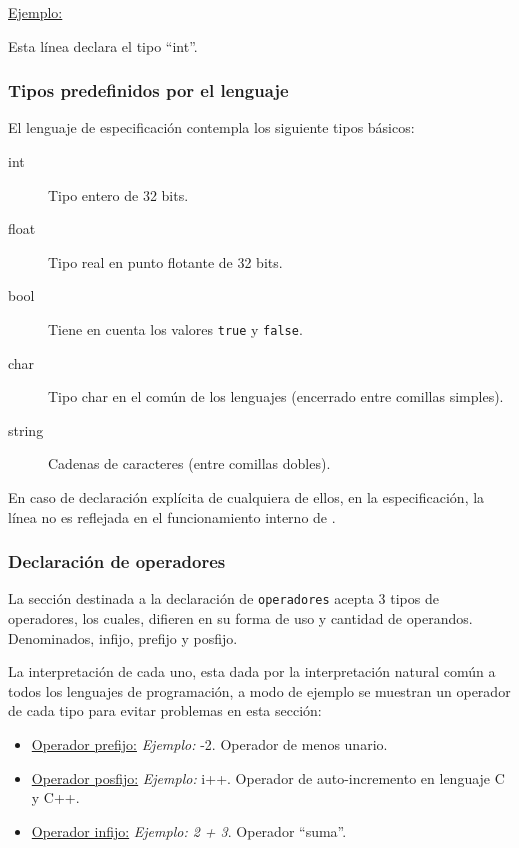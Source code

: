 \underline{Ejemplo:} \begin{center}
    \end{center}
\vspace{0.2cm}
Esta línea declara el tipo ``int''.

\subsubsection*{Tipos predefinidos por el lenguaje}
\label{sec:typepredefined}

El lenguaje de especificación contempla los siguiente tipos básicos:

\begin{description}
\item [int] Tipo entero de 32 bits.

\item [float] Tipo real en punto flotante de 32 bits.

\item [bool] Tiene en cuenta los valores \texttt{true} y \texttt{false}.

\item [char] Tipo char en el común de los lenguajes (encerrado entre comillas simples).

\item [string] Cadenas de caracteres (entre comillas dobles).
\end{description}

En caso de declaración explícita de cualquiera de ellos, en la especificación, la línea no es reflejada en el funcionamiento interno de \maggen.

\subsubsection{Declaración de operadores}
La sección destinada a la declaración de \texttt{operadores} acepta 3 tipos de operadores, los cuales, difieren en su forma de uso y cantidad de operandos. Denominados, infijo, prefijo y posfijo. 

La interpretación de cada uno, esta dada por la interpretación natural común a todos los lenguajes de programación, a modo de ejemplo se muestran un operador de cada tipo para evitar problemas en esta sección:

\begin{itemize}
\item \underline{Operador prefijo:} \textit{Ejemplo:} -2. Operador de menos unario. 

\item \underline{Operador posfijo:} \textit{Ejemplo:} i++. Operador de auto-incremento en lenguaje C y C++.

\item \underline{Operador infijo:} \textit{Ejemplo: 2 + 3}. Operador ``suma''.
\end{itemize}


